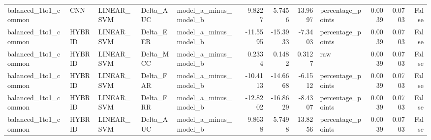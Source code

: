 \begin{table}
\begin{tabular}{lllllrrrlrrr}
balanced\_1to1\_common & CNN & LINEAR\_SVM & Delta\_AUC & model\_a\_minus\_model\_b & 9.8227 & 5.7456 & 13.9697 & percentage\_points & 0.0039 & 0.0703 & False \\
balanced\_1to1\_common & HYBRID & LINEAR\_SVM & Delta\_EER & model\_a\_minus\_model\_b & -11.5595 & -15.3933 & -7.3403 & percentage\_points & 0.0039 & 0.0703 & False \\
balanced\_1to1\_common & HYBRID & LINEAR\_SVM & Delta\_MCC & model\_a\_minus\_model\_b & 0.2334 & 0.1482 & 0.3127 & raw & 0.0039 & 0.0703 & False \\
balanced\_1to1\_common & HYBRID & LINEAR\_SVM & Delta\_FAR & model\_a\_minus\_model\_b & -10.4113 & -14.6668 & -6.1512 & percentage\_points & 0.0039 & 0.0703 & False \\
balanced\_1to1\_common & HYBRID & LINEAR\_SVM & Delta\_FRR & model\_a\_minus\_model\_b & -12.8202 & -16.8629 & -8.4307 & percentage\_points & 0.0039 & 0.0703 & False \\
balanced\_1to1\_common & HYBRID & LINEAR\_SVM & Delta\_AUC & model\_a\_minus\_model\_b & 9.8638 & 5.7498 & 13.8256 & percentage\_points & 0.0039 & 0.0703 & False \\
\bottomrule
\end{tabular}
\end{table}
